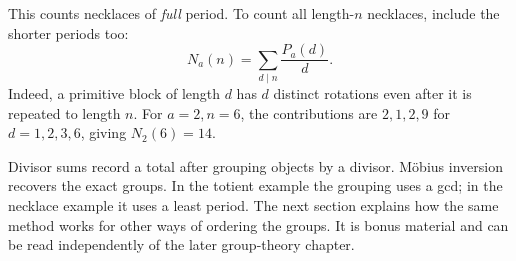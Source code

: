 \begin{warningbox}[breakable=false]
This counts necklaces of \emph{full} period. To count all length-$n$
necklaces, include the shorter periods too:
\[
 N_a(n)=\sum_{d\mid n}\frac{P_a(d)}d.
\]
Indeed, a primitive block of length $d$ has $d$ distinct rotations
even after it is repeated to length $n$. For $a=2,n=6$, the contributions
are $2,1,2,9$ for $d=1,2,3,6$, giving $N_2(6)=14$.
\end{warningbox}

\begin{checkpoint}
Divisor sums record a total after grouping objects by a divisor.
M\"obius inversion recovers the exact groups. In the totient example
the grouping uses a gcd; in the necklace example it uses a least period.
The next section explains how the same method works for other ways of
ordering the groups. It is bonus material and can be read independently
of the later group-theory chapter.
\end{checkpoint}
